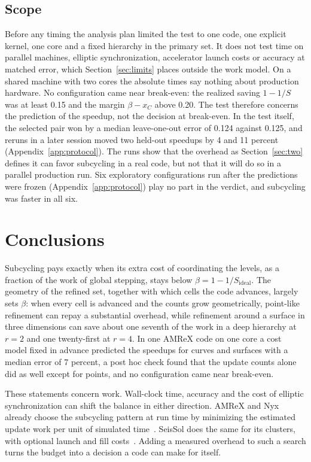 \documentclass[12pt]{article}
\theoremstyle{remark}
\newcommand{\Sid}{S_{\mathrm{ideal}}}
\begin{document}
\subsection{Scope}\label{sec:scope}

Before any timing the analysis plan limited the test to one code, one explicit kernel, one core and a fixed hierarchy in the primary set. It does not test time on parallel machines, elliptic synchronization, accelerator launch costs or accuracy at matched error, which Section~\ref{sec:limits} places outside the work model. On a shared machine with two cores the absolute times say nothing about production hardware. No configuration came near break-even: the realized saving $1-1/S$ was at least 0.15 and the margin $\beta-x_C$ above 0.20. The test therefore concerns the prediction of the speedup, not the decision at break-even. In the test itself, the selected pair won by a median leave-one-out error of 0.124 against 0.125, and reruns in a later session moved two held-out speedups by 4 and 11 percent (Appendix~\ref{app:protocol}). The runs show that the overhead as Section~\ref{sec:two} defines it can favor subcycling in a real code, but not that it will do so in a parallel production run. Six exploratory configurations run after the predictions were frozen (Appendix~\ref{app:protocol}) play no part in the verdict, and subcycling was faster in all six.

\section{Conclusions}\label{sec:conclusions}

Subcycling pays exactly when its extra cost of coordinating the levels, as a fraction of the work of global stepping, stays below $\beta=1-1/\Sid$. The geometry of the refined set, together with which cells the code advances, largely sets $\beta$: when every cell is advanced and the counts grow geometrically, point-like refinement can repay a substantial overhead, while refinement around a surface in three dimensions can save about one seventh of the work in a deep hierarchy at $r=2$ and one twenty-first at $r=4$. In one AMReX code on one core a cost model fixed in advance predicted the speedups for curves and surfaces with a median error of 7 percent, a post hoc check found that the update counts alone did as well except for points, and no configuration came near break-even.

These statements concern work. Wall-clock time, accuracy and the cost of elliptic synchronization can shift the balance in either direction. AMReX and Nyx already choose the subcycling pattern at run time by minimizing the estimated update work per unit of simulated time~\cite{almgren2013nyx,amrex2026source}. SeisSol does the same for its clusters, with optional launch and fill costs~\cite{seissol2026local}. Adding a measured overhead to such a search turns the budget into a decision a code can make for itself.
\end{document}
